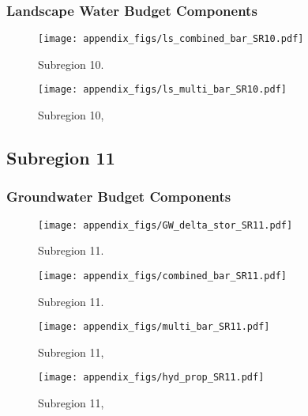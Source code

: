 \subsubsection{Landscape Water Budget Components}
\begin{figure}[ht]
\centerline{\texttt{[image: appendix\_figs/ls\_combined\_bar\_SR10.pdf]}}
\caption{\LSCombinedTextOne Subregion 10.\LSCombinedTextTwo}
\label{fig:LS_budget_SR10}
\end{figure}
\newpage

\begin{landscape}
\begin{figure}[ht]
\centerline{\texttt{[image: appendix\_figs/ls\_multi\_bar\_SR10.pdf]}}
\caption{\LSMultiTextOne Subregion 10,\LSMultiTextTwo}
\label{fig:multi_LS_budget_SR10}
\end{figure}
\newpage
\end{landscape}

\subsection{Subregion 11}
\subsubsection{Groundwater Budget Components}
\begin{figure}[h]
\centerline{\texttt{[image: appendix\_figs/GW\_delta\_stor\_SR11.pdf]}}
\caption{\GWBudgetText Subregion 11.}
\label{fig:delta_stor_SR11}
\end{figure}
\newpage

\begin{figure}[ht]
\centerline{\texttt{[image: appendix\_figs/combined\_bar\_SR11.pdf]}}
\caption{\GWCombinedTextOne Subregion 11.\GWCombinedTextTwo}
\label{fig:GW_budget_SR11}
\end{figure}
\newpage

\begin{landscape}
\begin{figure}[ht]
\centerline{\texttt{[image: appendix\_figs/multi\_bar\_SR11.pdf]}}
\caption{\GWMultiTextOne Subregion 11,\GWMultiTextTwo}
\label{fig:multi_GW_budget_SR11}
\end{figure}
\newpage

\begin{figure}[ht]
\centerline{\texttt{[image: appendix\_figs/hyd\_prop\_SR11.pdf]}}
\caption{\HydPropOne Subregion 11,\HydPropTwo}
\label{fig:hyd_prop_SR11}
\end{figure}
\newpage
\end{landscape}


